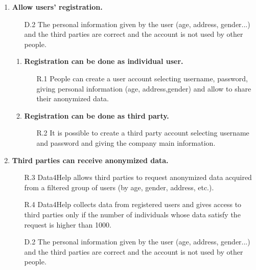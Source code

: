 \documentclass[a4paper]{article}
\begin{document}
    \begin{enumerate}[label*=\bf{G.\arabic*}]
        
        \item \textbf{Allow users’ registration.}
        \begin{enumerate}
            \item [D.2] The personal information given by the user (age, address, gender...) and the third parties are correct and the account is not used by other people. 
        \end{enumerate}
        
        \begin{enumerate}[label*=\bf{.\arabic*}]
            \item \textbf{Registration can be done as individual user.}
            \begin{enumerate}
                \item [R.1] People can create a user account selecting username, password, giving personal information (age, address,gender) and allow to share their anonymized data.
                
            \end{enumerate}
            
            \item \textbf{Registration can be done as third party.}
            \begin{enumerate}
                \item [R.2] It is possible to create a third party account selecting username and password and giving the company main information.
            \end{enumerate}
        \end{enumerate}
        
        \item \textbf{Third parties can receive anonymized data.}
                
        \begin{enumerate}
            \item [R.3] Data4Help allows third parties to request anonymized data acquired from a filtered group of users (by age, gender, address, etc.).
            \item [R.4] Data4Help collects data from registered users and gives access to third parties only if the number of individuals whose data satisfy the request is higher than 1000.
            \item [D.2] The personal information given by the user (age, address, gender...) and the third parties are correct and the account is not used by other people.
        \end{enumerate}
            

\end{enumerate}
\end{document}

